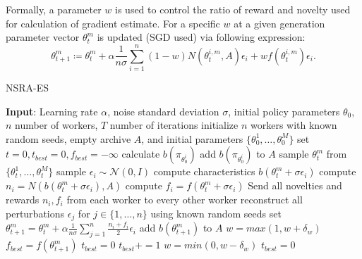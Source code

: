 Formally, a parameter $w$ is used to control the ratio of reward and novelty used for calculation of gradient estimate. For a specific $w$ at a given generation parameter vector $\theta_t^m$ is updated (SGD used) via following expression: 
\begin{equation}
    \theta^m_{t+1}\coloneqq\theta^m_t + \alpha \frac{1}{n\sigma}\sum_{i=1}^n (1-w)N(\theta_t^{i,m},A)\epsilon_i+wf(\theta_t^{i,m})\epsilon_i.
\end{equation}

\begin{algorithm}
    \begin{algorithmic}[1]
    \caption{NSRA-ES}
    \label{alg:nsra-es}
        \State \textbf{Input}: Learning rate $\alpha$, noise standard deviation $\sigma$, initial policy parameters $\theta_0$, $n$ number of workers, $T$ number of iterations
        \State initialize $n$ workers with known random seeds, empty archive $A$, and initial parameters $\{\theta^1_0,\dots, \theta^M_0\}$
        \State set $t=0, t_{best}=0, f_{best}=-\infty$
            \State calculate $b(\pi_{\theta^i_0})$
            \State add $b(\pi_{\theta^i_0})$ to $A$
        \EndFor
            \State sample $\theta_t^m$ from $\{\theta^1_t,\dots, \theta^M_t\}$
                \State sample $\epsilon_i \sim \mathcal{N}(0,I)$ 
                \State compute characteristics $b(\theta^m_t+\sigma\epsilon_i)$
                \State compute $n_i = N(b(\theta^m_t+\sigma\epsilon_i), A)$
                \State compute $f_i = f(\theta^m_t+\sigma\epsilon_i)$
            \EndFor
            \State Send all novelties and rewards $n_i, f_i$ from each worker to every other worker
                \State reconstruct all perturbations $\epsilon_j $ for $j \in \{1,\dots,n\}$ using known random seeds
                \State set $\theta^m_{t+1} = \theta_t^m + \alpha \frac{1}{n\sigma}\sum_{j=1}^n\frac{n_i+f_i}{2}\epsilon_i$
                \State add $b(\theta^m_{t+1})$ to $A$
            \EndFor
            \State $w=max(1, w+\delta_w)$
            \State $f_{best} = f(\theta^m_{t+1})$
            \State $t_{best} = 0$
        \Else
            \State $t_{best}+=1$
        \EndIf
            \State $w=min(0, w-\delta_w)$
            \State $t_{best} = 0$
        \Else
        \EndIf
        \EndFor
    \end{algorithmic}
\end{algorithm}


\cite{conti2018} 
